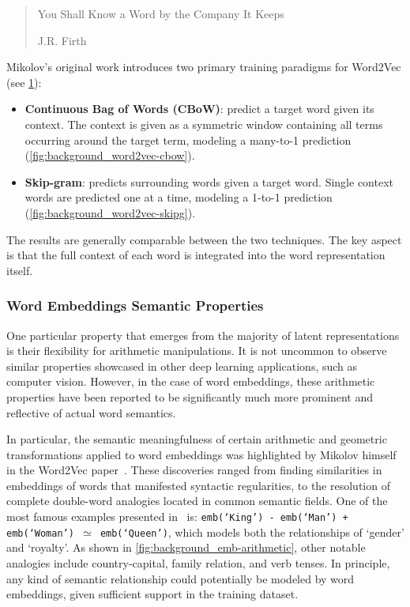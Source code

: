 \blockquote[J.R. Firth]{You Shall Know a Word by the Company It Keeps}

\begin{figure}[t!]
    \centering
    \quad
    \caption{}
    \label{fig:background_word2vec-cbow_word2vec-skipg}
\end{figure}

Mikolov's original work introduces two primary training paradigms for Word2Vec (see \cref{fig:background_word2vec-cbow_word2vec-skipg}):
\begin{itemize}
    \item \textbf{Continuous Bag of Words (CBoW)}: predict a target word given its context.
The context is given as a symmetric window containing all terms occurring around the target term, modeling a many-to-1 prediction (\cref{fig:background_word2vec-cbow}).
    \item \textbf{Skip-gram}: predicts surrounding words given a target word.
Single context words are predicted one at a time, modeling a 1-to-1 prediction (\cref{fig:background_word2vec-skipg}).
\end{itemize}
The results are generally comparable between the two techniques.
The key aspect is that the full context of each word is integrated into the word representation itself.

\subsubsection*{Word Embeddings Semantic Properties}

One particular property that emerges from the majority of latent representations is their flexibility for arithmetic manipulations.
It is not uncommon to observe similar properties showcased in other deep learning applications, such as computer vision.
However, in the case of word embeddings, these arithmetic properties have been reported to be significantly much more prominent and reflective of actual word semantics.

In particular, the semantic meaningfulness of certain arithmetic and geometric transformations applied to word embeddings was highlighted by Mikolov himself in the Word2Vec paper~\cite{mikolov2013}.
These discoveries ranged from finding similarities in embeddings of words that manifested syntactic regularities, to the resolution of complete double-word analogies located in common semantic fields.
One of the most famous examples presented in~\cite{mikolov2013} is: \texttt{emb(`King') - emb(`Man') + emb(`Woman') $\simeq$ emb(`Queen')}, which models both the relationships of `gender' and `royalty'.
As shown in \cref{fig:background_emb-arithmetic}, other notable analogies include country-capital, family relation, and verb tenses.
In principle, any kind of semantic relationship could potentially be modeled by word embeddings, given sufficient support in the training dataset.

